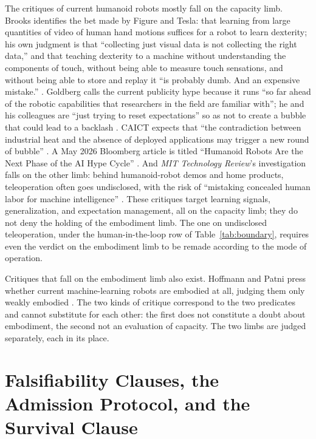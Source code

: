 \documentclass[10pt]{article}
\begin{document}
The critiques of current humanoid robots mostly fall on the capacity limb. Brooks identifies the bet made by Figure and Tesla: that learning from large quantities of video of human hand motions suffices for a robot to learn dexterity; his own judgment is that ``collecting just visual data is not collecting the right data,'' and that teaching dexterity to a machine without understanding the components of touch, without being able to measure touch sensations, and without being able to store and replay it ``is probably dumb. And an expensive mistake.'' \cite{brooks2025}. Goldberg calls the current publicity hype because it runs ``so far ahead of the robotic capabilities that researchers in the field are familiar with''; he and his colleagues are ``just trying to reset expectations'' so as not to create a bubble that could lead to a backlash \cite{goldberg2025}. CAICT expects that ``the contradiction between industrial heat and the absence of deployed applications may trigger a new round of bubble'' \cite{caict2025}. A May 2026 Bloomberg article is titled ``Humanoid Robots Are the Next Phase of the AI Hype Cycle'' \cite{bloomberg2026}. And \textit{MIT Technology Review}'s investigation falls on the other limb: behind humanoid-robot demos and home products, teleoperation often goes undisclosed, with the risk of ``mistaking concealed human labor for machine intelligence'' \cite{mittr2026}. These critiques target learning signals, generalization, and expectation management, all on the capacity limb; they do not deny the holding of the embodiment limb. The one on undisclosed teleoperation, under the human-in-the-loop row of Table~\ref{tab:boundary}, requires even the verdict on the embodiment limb to be remade according to the mode of operation.

Critiques that fall on the embodiment limb also exist. Hoffmann and Patni press whether current machine-learning robots are embodied at all, judging them only weakly embodied \cite{hoffmann2025}. The two kinds of critique correspond to the two predicates and cannot substitute for each other: the first does not constitute a doubt about embodiment, the second not an evaluation of capacity. The two limbs are judged separately, each in its place.

\section{Falsifiability Clauses, the Admission Protocol, and the Survival Clause}\label{sec:falsifiable}
\end{document}
